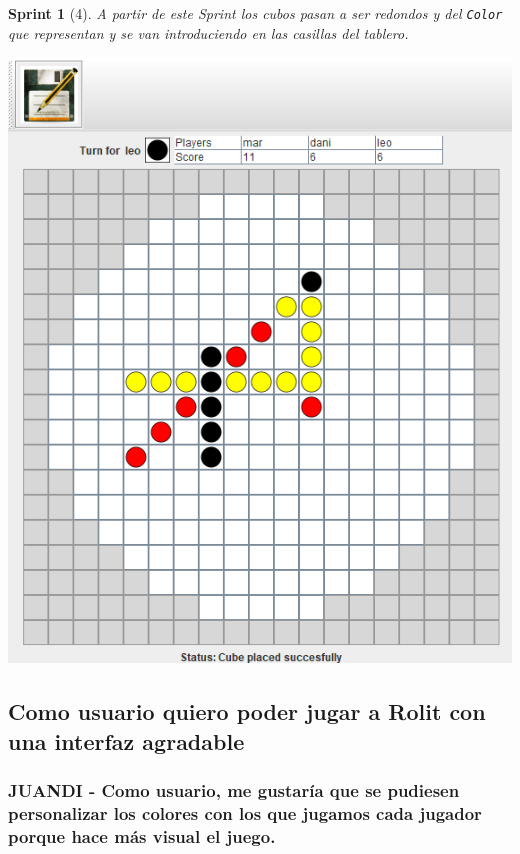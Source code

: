 \documentclass[12pt,a4paper,openright]{book}
\theoremstyle{break}
\newtheorem*{sprint}{Sprint}
\begin{document}
\begin{sprint}[4]

A partir de este Sprint los cubos pasan a ser redondos y del \texttt{Color} que representan y se van introduciendo en las casillas del tablero.
\begin{center}
\includegraphics[scale=0.5]{cubos-redondos.png}
\end{center}

\end{sprint}
\newpage

\subsection{Como usuario quiero poder jugar a Rolit con una interfaz agradable}

\subsubsection{JUANDI - Como usuario, me gustaría que se pudiesen personalizar los colores con los que jugamos cada jugador porque hace más visual el juego.}
\end{document}

